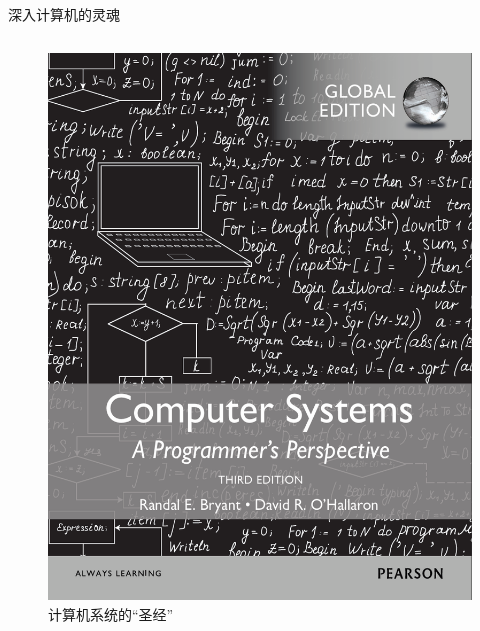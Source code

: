 \documentclass{beamer}
\begin{document}
\begin{frame}{深入计算机的灵魂}
\begin{columns}[T]
        \begin{column}{0.5\textwidth}
            \begin{figure}
                \centering
                \includegraphics[width=0.7\linewidth]{assets/csapp.png}
                \caption{计算机系统的“圣经”}
            \end{figure}
        \end{column}
    \end{columns}
\end{frame}
\end{document}
